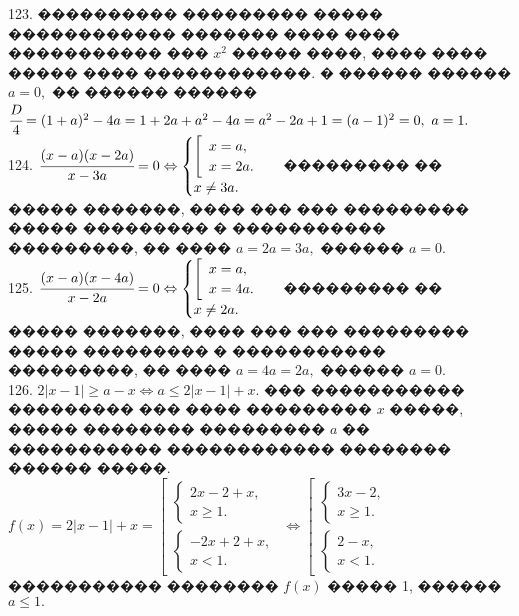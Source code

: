 \documentclass[12pt]{article}
\begin{document}
123. ���������� ��������� ����� ������������ ������� ���� ���� ����������� ��� $x^2$ ����� ����, ���� ���� ����� ���� ������������. � ������ ������ $a=0,$ �� ������ ������ $\cfrac{D}{4}=(1+a)^2-4a=1+2a+a^2-4a=a^2-2a+1=(a-1)^2=0,\ a=1.$\\
124. $\cfrac{(x-a)(x-2a)}{x-3a}=0\Leftrightarrow \begin{cases} \left[\begin{array}{l} x=a,\\ x=2a.\end{array}\right.\\ x\neq 3a.\end{cases}$ ��������� �� ����� �������, ���� ��� ��� ��������� ����� ��������� � ����������� ���������, �� ���� $a=2a=3a,$ ������ $a=0.$\\
125. $\cfrac{(x-a)(x-4a)}{x-2a}=0\Leftrightarrow \begin{cases} \left[\begin{array}{l} x=a,\\ x=4a.\end{array}\right.\\ x\neq 2a.\end{cases}$ ��������� �� ����� �������, ���� ��� ��� ��������� ����� ��������� � ����������� ���������, �� ���� $a=4a=2a,$ ������ $a=0.$\\
126. $2|x-1|\geqslant a-x\Leftrightarrow a\leqslant  2|x-1|+x.$ ��� ����������� ��������� ��� ���� ��������� $x$ �����, ����� �������� ��������� $a$ �� ����������� ������������ �������� ������ �����. $f(x)=2|x-1|+x=\left[\begin{array}{l}\begin{cases}2x-2+x,\\ x\geqslant 1. \end{cases}\\ \begin{cases}-2x+2+x,\\ x< 1. \end{cases}\end{array}\right.\Leftrightarrow\left[\begin{array}{l}\begin{cases}3x-2,\\ x\geqslant 1. \end{cases}\\ \begin{cases}2-x,\\ x<1. \end{cases}\end{array}\right.$ ����������� �������� $f(x)$ ����� 1, ������ $a\leqslant1.$\\
\end{document}
